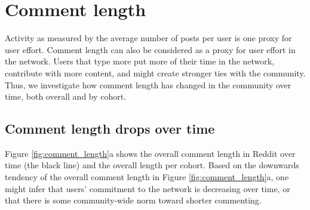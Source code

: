 \section{Comment length}

\begin{figure*}[!tb]
\centering
{}
\caption{Figure (a) shows the average comment length over clock time and Figure (b) from the user-referential time. Both figures show the cohorted trends and the overall users trends.  The overall average length per comment decreases over time, although for any individual cohort, it increases after a sharp initial drop. Figure (c), similar to Figure \ref{fig:avr_posts_per_user_for_surviving_year}, shows the monthly average comment length for active users in the cohorts of 2010, 2011 and 2012, segmented by the number of years that the user survived in the network.  Opposite the analysis for average posts, which showed that low-activity users were the first to leave Reddit, here, people who start out as longer commenters are \textit{more} likely to leave.}
\label{fig:comment_length}
\end{figure*}

Activity as measured by the average number of posts per user is one proxy for user effort.  Comment length can also be considered as a proxy for user effort in the network.  Users that type more put more of their time in the network, contribute with more content, and might create stronger ties with the community.  Thus, we investigate how comment length has changed in the community over time, both overall and by cohort. 

\subsection{Comment length drops over time}

Figure \ref{fig:comment_length}a shows the overall comment length in Reddit over time (the black line) and the overall length per cohort. 
Based on the downwards tendency of the overall comment length in Figure \ref{fig:comment_length}a, one might infer that users' commitment to the network is decreasing over time, or that there is some community-wide norm toward shorter commenting. 


